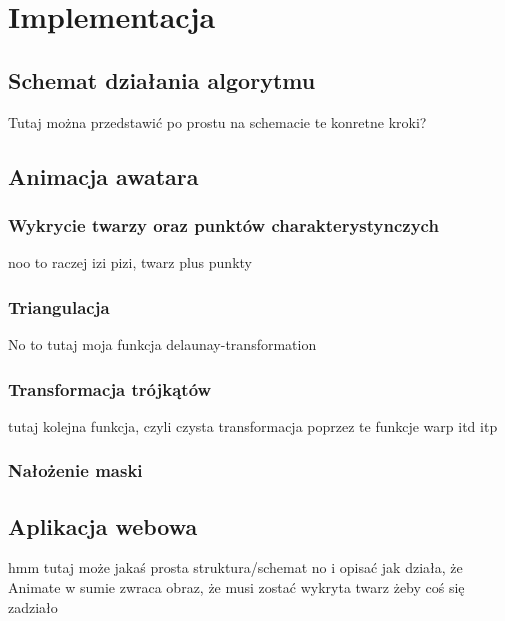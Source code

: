 \chapter{Implementacja}
\label{cha:implementacja}
\section{Schemat działania algorytmu}
Tutaj można przedstawić po prostu na schemacie te konretne kroki?
\section{Animacja awatara}
\subsection{Wykrycie twarzy oraz punktów charakterystynczych}
noo to raczej izi pizi, twarz plus punkty
\subsection{Triangulacja}
No to tutaj moja funkcja delaunay-transformation
\subsection{Transformacja trójkątów}
tutaj kolejna funkcja, czyli czysta transformacja poprzez te funkcje warp itd itp
\subsection{Nałożenie maski}
\section{Aplikacja webowa}
hmm tutaj może jakaś prosta struktura/schemat
no i opisać jak działa, że Animate w sumie zwraca obraz, że musi zostać wykryta twarz żeby coś się zadziało
